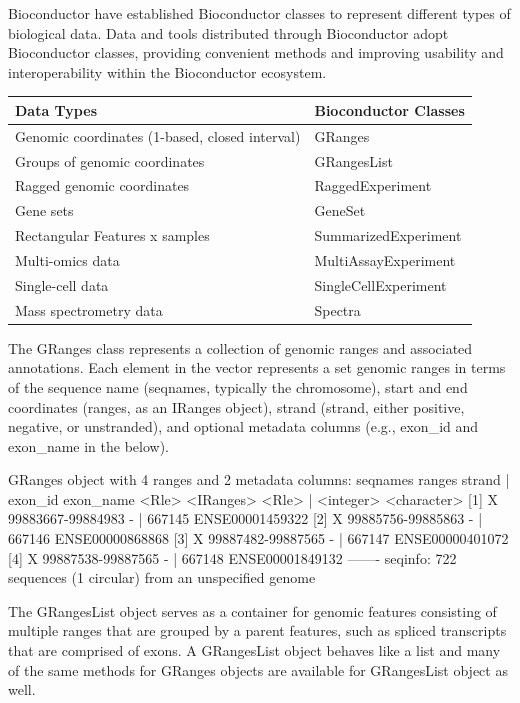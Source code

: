 \documentclass[]{article}
\renewenvironment{verbatim}{\color{codecolor}\begin{myshaded}\begin{oldverbatim}}{\end{oldverbatim}\end{myshaded}}
\begin{document}
Bioconductor have established Bioconductor classes to represent different types of biological data. Data and tools distributed through Bioconductor adopt Bioconductor classes, providing convenient methods and improving usability and interoperability within the Bioconductor ecosystem.

\begin{tabular}[t]{ll}
\toprule
Data Types & Bioconductor Classes\\
\midrule
Genomic coordinates (1-based, closed interval) & GRanges\\
Groups of genomic coordinates & GRangesList\\
Ragged genomic coordinates & RaggedExperiment\\
Gene sets & GeneSet\\
Rectangular Features x samples & SummarizedExperiment\\
\addlinespace
Multi-omics data & MultiAssayExperiment\\
Single-cell data & SingleCellExperiment\\
Mass spectrometry data & Spectra\\
\bottomrule
\end{tabular}

The GRanges class represents a collection of genomic ranges and associated annotations. Each element in the vector represents a set genomic ranges in terms of the sequence name (seqnames, typically the chromosome), start and end coordinates (ranges, as an IRanges object), strand (strand, either positive, negative, or unstranded), and optional metadata columns (e.g., exon\_id and exon\_name in the below).

\begin{verbatim}
GRanges object with 4 ranges and 2 metadata columns:
      seqnames            ranges strand |   exon_id       exon_name
         <Rle>         <IRanges>  <Rle> | <integer>     <character>
  [1]        X 99883667-99884983      - |    667145 ENSE00001459322
  [2]        X 99885756-99885863      - |    667146 ENSE00000868868
  [3]        X 99887482-99887565      - |    667147 ENSE00000401072
  [4]        X 99887538-99887565      - |    667148 ENSE00001849132
  -------
  seqinfo: 722 sequences (1 circular) from an unspecified genome
\end{verbatim}

The GRangesList object serves as a container for genomic features consisting of multiple
ranges that are grouped by a parent features, such as spliced transcripts that are
comprised of exons. A GRangesList object behaves like a list and many of the same
methods for GRanges objects are available for GRangesList object as well.
\end{document}
